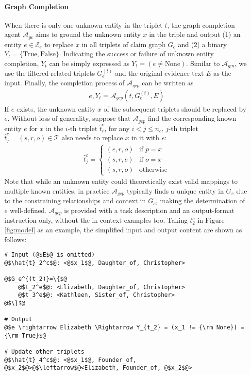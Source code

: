 \paragraph{Graph Completion}\label{sec:Graph Completion} When there is only one unknown entity in the triplet $t$, the graph completion agent $\mathcal{A}_{gc}$ aims to ground the unknown entity $x$ in the triple and output (1) an entity $e \in \mathcal{E}_e$ to replace $x$ in all triplets of claim graph $G_c$ and (2) a binary $Y_t=\{\text{True}, \text{False}\}$. Indicating the success or failure of unknown entity completion, $Y_t$ can be simply expressed as $Y_t = (e \neq \text{None})$. Similar to $\mathcal{A}_{gm}$, we use the filtered related triplets $G_e^{(t)}$ and the original evidence text $E$ as the input. Finally, the completion process of $\mathcal{A}_{gcp}$ can be written as
\begin{align}
    e, Y_{t} = \mathcal{A}_{gcp}(t, G^{(t)}_e, E)
\end{align}
If $e$ exists, the unknown entity $x$ of the subsequent triplets should be replaced by $e$. Without loss of generality, suppose that $\mathcal{A}_{gcp}$ find the corresponding known entity $e$ for $x$ in the $i$-th triplet $\hat{t}^c_i$, for any $i<j\leq n_c$, $j$-th triplet $\hat{t}^c_j=(s, r, o) \in \mathcal{T}$ also needs to replace $x$ in it with $e$:
\begin{align}
\hat{t}^c_j =\begin{cases}
(e, r, o) & \text{if } p = x \\
(s, r, e) & \text{if } o = x \\
(s, r, o) & \text{otherwise}
\end{cases}
\end{align}
Note that while an unknown entity could theoretically exist valid mappings to multiple known entities, in practice \(\mathcal{A}_{gcp}\) typically finds a unique entity in $G_e$ due to the constraining relationships and context in $G_c$, making the determination of $e$ well-defined.
$\mathcal{A}_{gcp}$ is provided with a task description and an output-format instruction only, without the in-context examples too. Taking $t^c_2$ in Figure \ref{fig:model} as an example, the simplified input and output content  are shown as follows:
\begin{lstlisting}[style=myStyle*]
# Input (@$E$@ is omitted)
@$\hat{t}_2^c$@: <@$x_1$@, Daughter_of, Christopher>

@$G_e^{(t_2)}=\{$@
    @$t_2^e$@: <Elizabeth, Daughter_of, Christopher>
    @$t_3^e$@: <Kathleen, Sister_of, Christopher>
@$\}$@

# Output
@$e \rightarrow Elizabeth \Rightarrow Y_{t_2} = (x_1 != {\rm None}) = {\rm True}$@

# Update other triplets
@$\hat{t}_4^c$@: <@$x_1$@, Founder_of, @$x_2$@>@$\leftarrow$@<Elizabeth, Founder_of, @$x_2$@>
\end{lstlisting}

